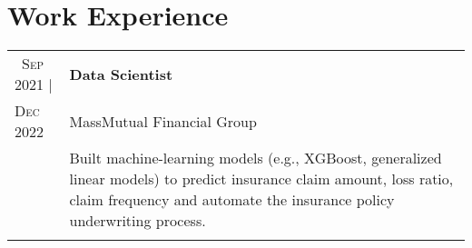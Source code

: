 \documentclass[10pt, oneside]{article}
\begin{document}
\section*{Work Experience}
\begin{tabularx}{\linewidth}{p{2.2cm}|p{16cm}}
	\toprule 

	\textsc{~Sep} 2021 | & \textbf{Data Scientist}\\
	\textsc{Dec 2022} & MassMutual Financial Group\\
	& Built machine-learning models (e.g., XGBoost, generalized linear models) to predict insurance claim amount, loss ratio, claim frequency and automate the insurance policy underwriting process.
	\\\\


\end{tabularx}
\end{document}

